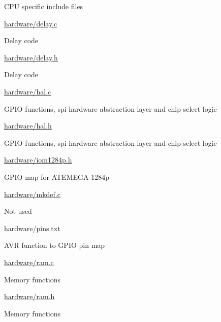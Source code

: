\begin{DoxyItemize}
\begin{DoxyItemize}
\begin{DoxyItemize}
\item C\+PU specific include files
\end{DoxyItemize}
\item \hyperlink{delay_8c}{hardware/delay.\+c}
\begin{DoxyItemize}
\item Delay code
\end{DoxyItemize}
\item \hyperlink{delay_8h}{hardware/delay.\+h}
\begin{DoxyItemize}
\item Delay code
\end{DoxyItemize}
\item \hyperlink{hal_8c}{hardware/hal.\+c}
\begin{DoxyItemize}
\item G\+P\+IO functions, spi hardware abstraction layer and chip select logic
\end{DoxyItemize}
\item \hyperlink{hal_8h}{hardware/hal.\+h}
\begin{DoxyItemize}
\item G\+P\+IO functions, spi hardware abstraction layer and chip select logic
\end{DoxyItemize}
\item \hyperlink{iom1284p_8h}{hardware/iom1284p.\+h}
\begin{DoxyItemize}
\item G\+P\+IO map for A\+T\+E\+M\+E\+GA 1284p
\end{DoxyItemize}
\item \hyperlink{mkdef_8c}{hardware/mkdef.\+c}
\begin{DoxyItemize}
\item Not used
\end{DoxyItemize}
\item hardware/pins.\+txt
\begin{DoxyItemize}
\item A\+VR function to G\+P\+IO pin map
\end{DoxyItemize}
\item \hyperlink{ram_8c}{hardware/ram.\+c}
\begin{DoxyItemize}
\item Memory functions
\end{DoxyItemize}
\item \hyperlink{ram_8h}{hardware/ram.\+h}
\begin{DoxyItemize}
\item Memory functions

\end{DoxyItemize}
\end{DoxyItemize}
\end{DoxyItemize}
